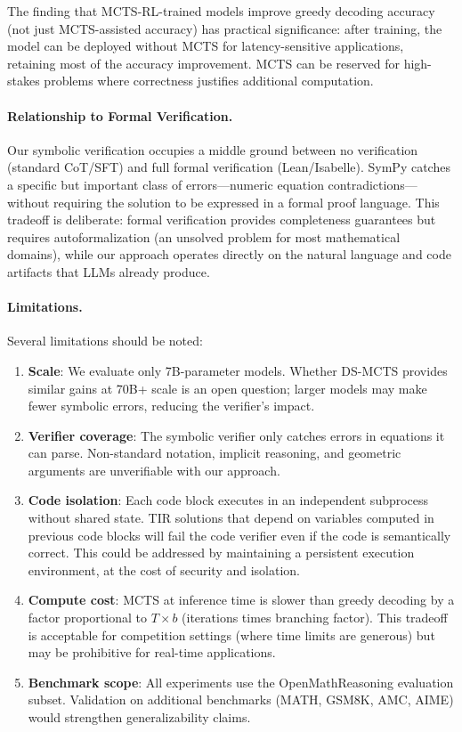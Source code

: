 \documentclass[11pt,a4paper]{article}
\begin{document}
The finding that MCTS-RL-trained models improve greedy decoding accuracy (not
just MCTS-assisted accuracy) has practical significance: after training, the
model can be deployed without MCTS for latency-sensitive applications, retaining
most of the accuracy improvement. MCTS can be reserved for high-stakes problems
where correctness justifies additional computation.

\paragraph{Relationship to Formal Verification.}
Our symbolic verification occupies a middle ground between no verification
(standard CoT/SFT) and full formal verification (Lean/Isabelle). SymPy catches
a specific but important class of errors---numeric equation contradictions---without
requiring the solution to be expressed in a formal proof language. This
tradeoff is deliberate: formal verification provides completeness guarantees
but requires autoformalization (an unsolved problem for most mathematical
domains), while our approach operates directly on the natural language and code
artifacts that LLMs already produce.

\paragraph{Limitations.}
Several limitations should be noted:

\begin{enumerate}[nosep]
    \item \textbf{Scale}: We evaluate only 7B-parameter models. Whether DS-MCTS
    provides similar gains at 70B+ scale is an open question; larger models may
    make fewer symbolic errors, reducing the verifier's impact.

    \item \textbf{Verifier coverage}: The symbolic verifier only catches errors
    in equations it can parse. Non-standard notation, implicit reasoning, and
    geometric arguments are unverifiable with our approach.

    \item \textbf{Code isolation}: Each code block executes in an independent
    subprocess without shared state. TIR solutions that depend on variables
    computed in previous code blocks will fail the code verifier even if the
    code is semantically correct. This could be addressed by maintaining a
    persistent execution environment, at the cost of security and isolation.

    \item \textbf{Compute cost}: MCTS at inference time is slower than greedy
    decoding by a factor proportional to $T \times b$ (iterations times
    branching factor). This tradeoff is acceptable for competition settings
    (where time limits are generous) but may be prohibitive for real-time
    applications.

    \item \textbf{Benchmark scope}: All experiments use the OpenMathReasoning
    evaluation subset. Validation on additional benchmarks (MATH, GSM8K, AMC,
    AIME) would strengthen generalizability claims.
\end{enumerate}
\end{document}
